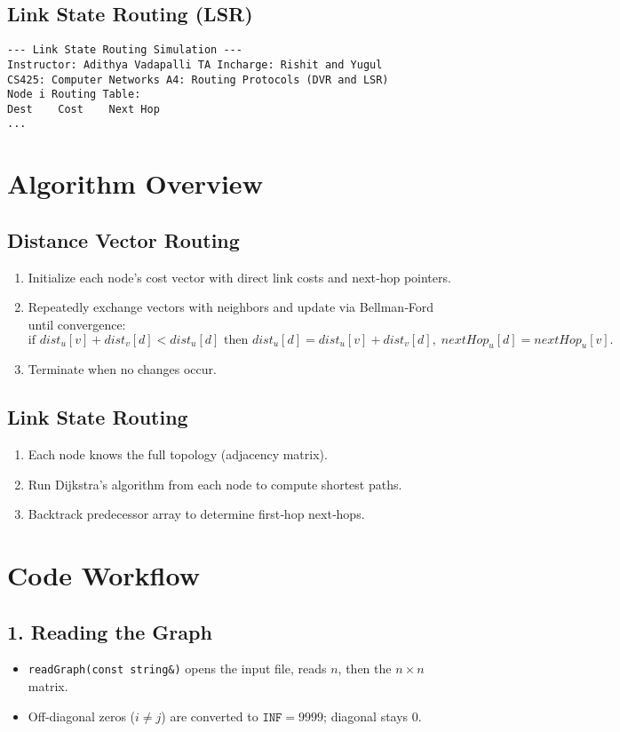 \documentclass[12pt]{article}
\begin{document}
\subsection*{Link State Routing (LSR)}
\begin{verbatim}
--- Link State Routing Simulation ---
Instructor: Adithya Vadapalli TA Incharge: Rishit and Yugul
CS425: Computer Networks A4: Routing Protocols (DVR and LSR)
Node i Routing Table:
Dest    Cost    Next Hop
...
\end{verbatim}

\section*{Algorithm Overview}
\subsection*{Distance Vector Routing}
\begin{enumerate}
  \item Initialize each node’s cost vector with direct link costs and next‑hop pointers.
  \item Repeatedly exchange vectors with neighbors and update via Bellman‑Ford until convergence:
  \[
    \text{if } dist_u[v] + dist_v[d] < dist_u[d] \text{ then }
      dist_u[d] = dist_u[v] + dist_v[d],\;
      nextHop_u[d] = nextHop_u[v].
  \]
  \item Terminate when no changes occur.
\end{enumerate}

\subsection*{Link State Routing}
\begin{enumerate}
  \item Each node knows the full topology (adjacency matrix).
  \item Run Dijkstra’s algorithm from each node to compute shortest paths.
  \item Backtrack predecessor array to determine first‑hop next‑hops.
\end{enumerate}

\section*{Code Workflow}
\subsection*{1. Reading the Graph}
\begin{itemize}
  \item \texttt{readGraph(const string\&)} opens the input file, reads \(n\), then the \(n\times n\) matrix.
  \item Off‑diagonal zeros (\(i \neq j\)) are converted to \(\texttt{INF}=9999\); diagonal stays 0.
\end{itemize}
\end{document}
